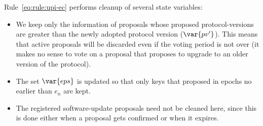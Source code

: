 Rule~\ref{eq:rule:upi-ec} performs cleanup of several state variables:
\begin{itemize}
\item We keep only the information of proposals whose proposed
  protocol-versions are greater than the newly adopted protocol version
  ($\var{pv'}$). This means that active proposals will be discarded even if the
  voting period is not over (it makes no sense to vote on a proposal that
  proposes to upgrade to an older version of the protocol).
\item The set $\var{eps}$ is updated so that only keys that proposed in epochs
  no earlier than $e_n$ are kept.
\item The registered software-update proposals need not be cleaned here, since
  this is done either when a proposal gets confirmed or when it expires.
\end{itemize}

